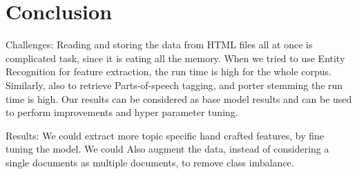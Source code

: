 \documentclass[conference]{IEEEtran}
\begin{document}
\section{Conclusion}
\vspace{1mm}
\justify
Challenges: Reading and storing the data from HTML files all at once is complicated task, since it is eating all the memory. When we tried to use Entity Recognition for feature extraction, the run time is high for the whole corpus.
Similarly, also to retrieve Parts-of-speech tagging, and porter stemming the run time is high.
Our results can be considered as base model results and can be used to perform improvements and hyper parameter tuning.


\vspace{1mm}
\justify
Results: We could extract more topic specific hand crafted features, by fine tuning the model.
We could Also augment the data, instead of considering a single documents as multiple documents, to remove class imbalance.





































\medskip

\printbibliography
\end{document}
